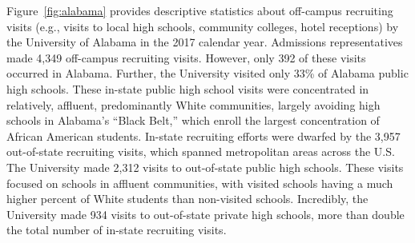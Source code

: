 \documentclass[twoside]{article}
\begin{document}
Figure~\ref{fig:alabama} provides descriptive statistics about off-campus recruiting visits (e.g., visits to local high schools, community colleges, hotel receptions) by the University of Alabama in the 2017 calendar year.  Admissions representatives made 4,349 off-campus recruiting visits.  However, only 392 of these visits occurred in Alabama.  Further, the University visited only 33\% of Alabama public high schools. These in-state public high school visits were concentrated in relatively, affluent, predominantly White communities, largely avoiding high schools in Alabama's ``Black Belt,'' which enroll the largest concentration of African American students.  In-state recruiting efforts were dwarfed by the 3,957 out-of-state recruiting visits, which spanned metropolitan areas across the U.S. The University made 2,312 visits to out-of-state public high schools. These visits focused on schools in affluent communities, with visited schools having a much higher percent of White students than non-visited schools.  Incredibly, the University made 934 visits to out-of-state private high schools, more than double the total number of in-state recruiting visits.

\end{document}

